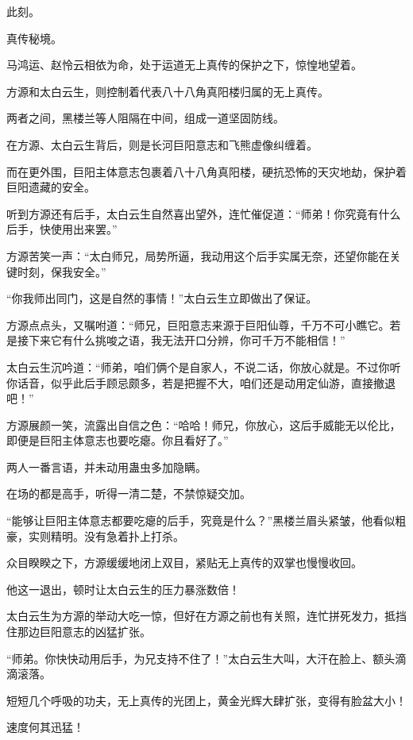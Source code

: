 
\begin{this_body}

此刻。

真传秘境。

马鸿运、赵怜云相依为命，处于运道无上真传的保护之下，惊惶地望着。

方源和太白云生，则控制着代表八十八角真阳楼归属的无上真传。

两者之间，黑楼兰等人阻隔在中间，组成一道坚固防线。

在方源、太白云生背后，则是长河巨阳意志和飞熊虚像纠缠着。

而在更外围，巨阳主体意志包裹着八十八角真阳楼，硬抗恐怖的天灾地劫，保护着巨阳遗藏的安全。

听到方源还有后手，太白云生自然喜出望外，连忙催促道：“师弟！你究竟有什么后手，快使用出来罢。”

方源苦笑一声：“太白师兄，局势所逼，我动用这个后手实属无奈，还望你能在关键时刻，保我安全。”

“你我师出同门，这是自然的事情！”太白云生立即做出了保证。

方源点点头，又嘱咐道：“师兄，巨阳意志来源于巨阳仙尊，千万不可小瞧它。若是接下来它有什么挑唆之语，我无法开口分辨，你可千万不能相信！”

太白云生沉吟道：“师弟，咱们俩个是自家人，不说二话，你放心就是。不过你听你话音，似乎此后手顾忌颇多，若是把握不大，咱们还是动用定仙游，直接撤退吧！”

方源展颜一笑，流露出自信之色：“哈哈！师兄，你放心，这后手威能无以伦比，即便是巨阳主体意志也要吃瘪。你且看好了。”

两人一番言语，并未动用蛊虫多加隐瞒。

在场的都是高手，听得一清二楚，不禁惊疑交加。

“能够让巨阳主体意志都要吃瘪的后手，究竟是什么？”黑楼兰眉头紧皱，他看似粗豪，实则精明。没有急着扑上打杀。

众目睽睽之下，方源缓缓地闭上双目，紧贴无上真传的双掌也慢慢收回。

他这一退出，顿时让太白云生的压力暴涨数倍！

太白云生为方源的举动大吃一惊，但好在方源之前也有关照，连忙拼死发力，抵挡住那边巨阳意志的凶猛扩张。

“师弟。你快快动用后手，为兄支持不住了！”太白云生大叫，大汗在脸上、额头滴滴滚落。

短短几个呼吸的功夫，无上真传的光团上，黄金光辉大肆扩张，变得有脸盆大小！

速度何其迅猛！


\end{this_body}
